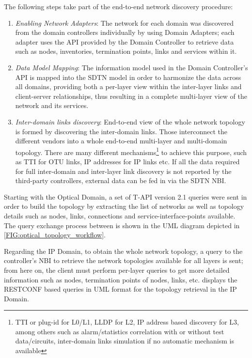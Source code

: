 \documentclass[a4paper,fleqn]{cas-dc}
\begin{document}
The following steps take part of the end-to-end network discovery procedure:
\begin{enumerate}
    \item \textit{Enabling Network Adapters}: The network for each domain was discovered from the domain controllers individually by using Domain Adapters; each adapter uses the API provided by the Domain Controller to retrieve data such as nodes, inventories, termination points, links and services within it.
    \item \textit{Data Model Mapping}: The information model used in the Domain Controller's API is mapped into the SDTN model in order to harmonize the data across all domains, providing both a per-layer view within the inter-layer links and client-server relationships, thus resulting in a complete multi-layer view of the network and its services.
    \item \textit{Inter-domain links discovery}: End-to-end view of the whole network topology is formed by discovering the inter-domain links. Those interconnect the different vendors into a whole end-to-end multi-layer and multi-domain topology. There are many different mechanisms\footnote{TTI or plug-id for L0/L1, LLDP for L2, IP address based discovery for L3, among others such as alarm/statistics correlation with or without test data/circuits, inter-domain links simulation if no automatic mechanism is available} 
    to achieve this purpose, such as TTI for OTU links, IP addresses for IP links etc. If all the data required for full inter-domain and inter-layer link discovery is not reported by the third-party controllers, external data can be fed in via the SDTN NBI. 
\end{enumerate}

Starting with the Optical Domain, a set of T-API version 2.1 queries were sent in order to build the topology by extracting the list of networks as well as topology details such as nodes, links, connections and service-interface-points available. The query exchange process between is shown in the UML diagram depicted in \cref{FIG:optical_topology_workflow}.  

Regarding the IP Domain, to obtain the whole network topology, a query to the controller’s NBI to retrieve the network topologies available for all layers is sent; from here on, the client must perform per-layer queries to get more detailed information such as nodes, termination points of nodes, links, etc.  displays the RESTCONF based queries in UML format for the topology retrieval in the IP Domain. 
\end{document}
